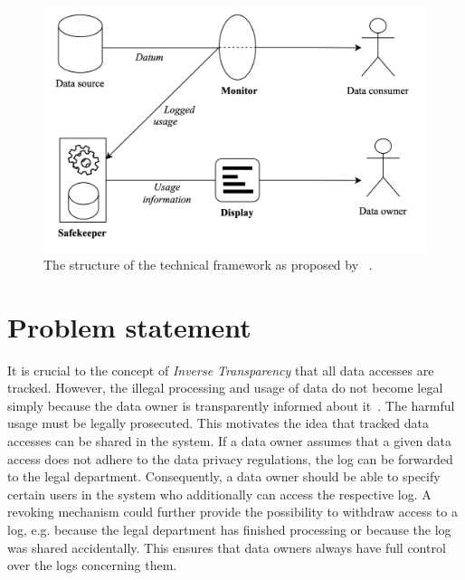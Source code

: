 \documentclass[../main.tex]{subfiles}
\begin{document}
\begin{figure}[ht]
    \includegraphics[scale=0.16]{../img/01/toolchain.png}
    \centering
    \caption[Existing toolchain]{The structure of the technical framework as proposed by \citeauthor{Zieglmeier2021}~\cite{Zieglmeier2021}.}
    \label{fig:toolchain}
\end{figure}

\section{Problem statement}

It is crucial to the concept of \emph{Inverse Transparency} that all data accesses are tracked.
However, the illegal processing and usage of data do not become legal simply because the data owner is transparently informed about it~\cite{Boes2022}.
The harmful usage must be legally prosecuted.
This motivates the idea that tracked data accesses can be shared in the system.
If a data owner assumes that a given data access does not adhere to the data privacy regulations, the log can be forwarded to the legal department.
Consequently, a data owner should be able to specify certain users in the system who additionally can access the respective log.
A revoking mechanism could further provide the possibility to withdraw access to a log, e.g. because the legal department has finished processing or because the log was shared accidentally.
This ensures that data owners always have full control over the logs concerning them.
\end{document}
